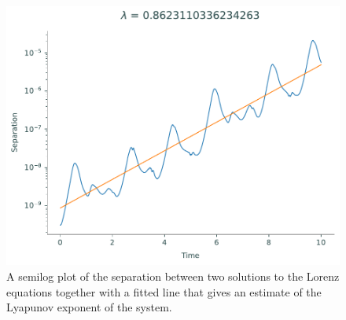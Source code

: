 \begin{figure}
\includegraphics[width=\textwidth]{figures/semilog.pdf}
\caption{A semilog plot of the separation between two solutions to the Lorenz equations together with a fitted line that gives an estimate of the Lyapunov exponent of the system.}
\label{fig:lyapunov_exponent}
\end{figure}

